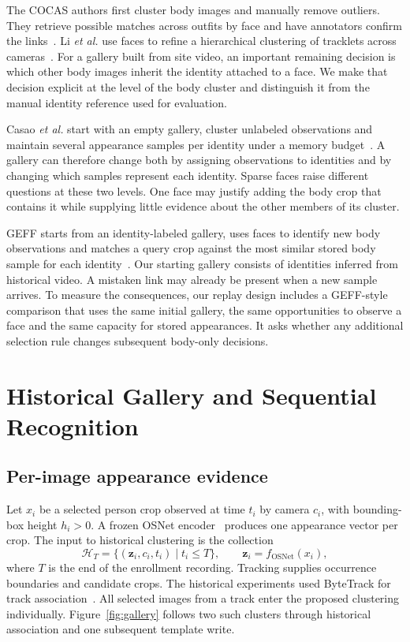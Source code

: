 \documentclass[journal,letterpaper]{IEEEtran}
\begin{document}
The COCAS authors first cluster body images and manually remove outliers. They retrieve possible matches across outfits by face and have annotators confirm the links~\cite{cocas}. Li \emph{et al.} use faces to refine a hierarchical clustering of tracklets across cameras~\cite{li}. For a gallery built from site video, an important remaining decision is which other body images inherit the identity attached to a face. We make that decision explicit at the level of the body cluster and distinguish it from the manual identity reference used for evaluation.

Casao \emph{et al.} start with an empty gallery, cluster unlabeled observations and maintain several appearance samples per identity under a memory budget~\cite{casao}. A gallery can therefore change both by assigning observations to identities and by changing which samples represent each identity. Sparse faces raise different questions at these two levels. One face may justify adding the body crop that contains it while supplying little evidence about the other members of its cluster.

GEFF starts from an identity-labeled gallery, uses faces to identify new body observations and matches a query crop against the most similar stored body sample for each identity~\cite{geff}. Our starting gallery consists of identities inferred from historical video. A mistaken link may already be present when a new sample arrives. To measure the consequences, our replay design includes a GEFF-style comparison that uses the same initial gallery, the same opportunities to observe a face and the same capacity for stored appearances. It asks whether any additional selection rule changes subsequent body-only decisions.

\section{Historical Gallery and Sequential Recognition}\label{sec:method}
\subsection{Per-image appearance evidence}
Let $x_i$ be a selected person crop observed at time $t_i$ by camera $c_i$, with bounding-box height $h_i>0$. A frozen OSNet encoder~\cite{osnet} produces one appearance vector per crop. The input to historical clustering is the collection
\begin{equation}
 \mathcal H_T=\{(\mathbf z_i,c_i,t_i)\mid t_i\leq T\},
 \qquad \mathbf z_i=f_{\mathrm{OSNet}}(x_i),
 \label{eq:feature}
\end{equation}
where $T$ is the end of the enrollment recording. Tracking supplies occurrence boundaries and candidate crops. The historical experiments used ByteTrack for track association~\cite{bytetrack}. All selected images from a track enter the proposed clustering individually. Figure~\ref{fig:gallery} follows two such clusters through historical association and one subsequent template write.
\end{document}
